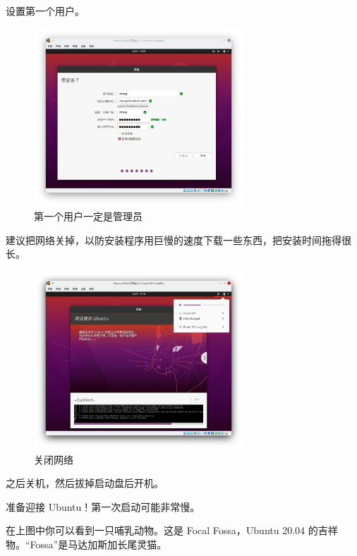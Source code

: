 \documentclass[UTF-8]{ctexart}
\begin{document}
				设置第一个用户。
				
				\begin{figure}[H]
					\centering
					\includegraphics[width=0.7\textwidth]{fig/ubuntu_install_7.png}
					\caption*{第一个用户一定是管理员}
				\end{figure}
			
				建议把网络关掉，以防安装程序用巨慢的速度下载一些东西，把安装时间拖得很长。
			
				\begin{figure}[H]
					\centering
					\includegraphics[width=0.7\textwidth]{fig/ubuntu_install_8.png}
					\caption*{关闭网络}
				\end{figure}
			
				之后关机，然后拔掉启动盘后开机。
				
				准备迎接 Ubuntu！第一次启动可能非常慢。
				
				在上图中你可以看到一只哺乳动物。这是 Focal Fossa，Ubuntu 20.04 的吉祥物。“Fossa”是马达加斯加长尾灵猫。
			
	\newpage
		
\end{document}
